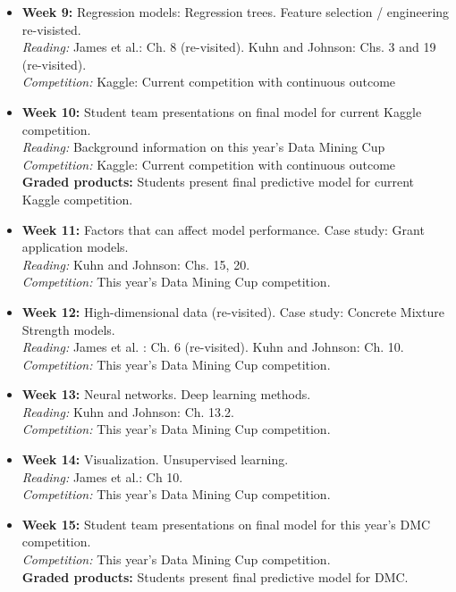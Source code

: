 \documentclass[11pt,oneside]{amsart}
\begin{document}
\begin{itemize}
\item \textbf{Week 9:} Regression models: Regression trees. Feature selection /
  engineering re-visisted.\\
\emph{Reading:} James et al.: Ch. 8 (re-visited). Kuhn and Johnson:
Chs. 3 and 19 (re-visited).\\
\emph{Competition:} Kaggle: Current competition with continuous
outcome

\item \textbf{Week 10:} Student team presentations on final model for current Kaggle
  competition.\\
\emph{Reading:} Background information on this year's Data Mining Cup\\
\emph{Competition:} Kaggle: Current competition with continuous
outcome\\
\textbf{Graded products:} Students present final predictive model for
current Kaggle competition.\\

\item \textbf{Week 11:} Factors that can affect model performance. Case study: Grant application models. \\
\emph{Reading:} Kuhn and Johnson: Chs. 15, 20. \\
\emph{Competition:} This year's Data Mining Cup competition.

\item \textbf{Week 12:} High-dimensional data (re-visited). Case study: Concrete Mixture Strength models.\\
\emph{Reading:} James et al. : Ch. 6 (re-visited). Kuhn and Johnson: Ch. 10.\\
\emph{Competition:} This year's Data Mining Cup competition.

\item \textbf{Week 13:} Neural networks. Deep learning methods. \\
\emph{Reading:} Kuhn and Johnson: Ch. 13.2. \\
\emph{Competition:} This year's Data Mining Cup competition.

\item \textbf{Week 14:} Visualization. Unsupervised learning.\\
\emph{Reading:} James et al.: Ch 10. \\
\emph{Competition:} This year's Data Mining Cup competition.

\item \textbf{Week 15:} Student team presentations on final model for
  this year's DMC  competition.\\
\emph{Competition:} This year's Data Mining Cup competition.\\
\textbf{Graded products:} Students present final predictive model for
DMC.

\end{itemize}
\end{document}
